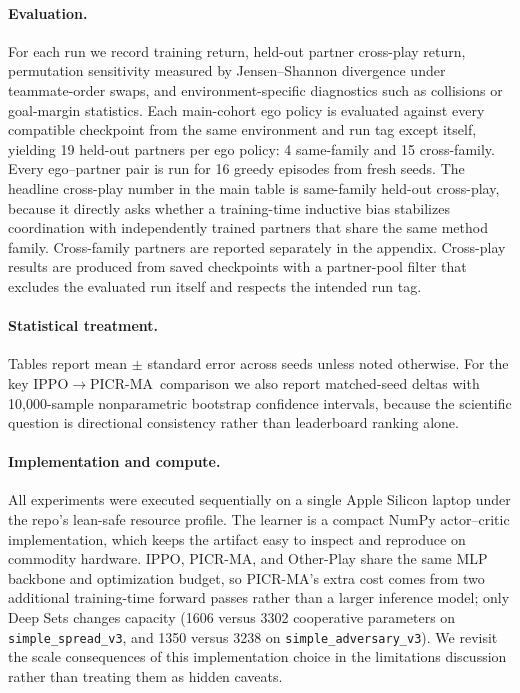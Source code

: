 \documentclass{article}
\newcommand{\method}{PICR-MA}
\begin{document}
\paragraph{Evaluation.}
For each run we record training return, held-out partner cross-play return, permutation sensitivity measured by Jensen--Shannon divergence under teammate-order swaps, and environment-specific diagnostics such as collisions or goal-margin statistics. Each main-cohort ego policy is evaluated against every compatible checkpoint from the same environment and run tag except itself, yielding 19 held-out partners per ego policy: 4 same-family and 15 cross-family. Every ego--partner pair is run for 16 greedy episodes from fresh seeds. The headline cross-play number in the main table is same-family held-out cross-play, because it directly asks whether a training-time inductive bias stabilizes coordination with independently trained partners that share the same method family. Cross-family partners are reported separately in the appendix. Cross-play results are produced from saved checkpoints with a partner-pool filter that excludes the evaluated run itself and respects the intended run tag.

\paragraph{Statistical treatment.}
Tables report mean $\pm$ standard error across seeds unless noted otherwise. For the key IPPO$\rightarrow$\method\ comparison we also report matched-seed deltas with 10{,}000-sample nonparametric bootstrap confidence intervals, because the scientific question is directional consistency rather than leaderboard ranking alone.

\paragraph{Implementation and compute.}
All experiments were executed sequentially on a single Apple Silicon laptop under the repo's lean-safe resource profile. The learner is a compact NumPy actor--critic implementation, which keeps the artifact easy to inspect and reproduce on commodity hardware. IPPO, \method, and Other-Play share the same MLP backbone and optimization budget, so \method's extra cost comes from two additional training-time forward passes rather than a larger inference model; only Deep Sets changes capacity (1606 versus 3302 cooperative parameters on \texttt{simple\_spread\_v3}, and 1350 versus 3238 on \texttt{simple\_adversary\_v3}). We revisit the scale consequences of this implementation choice in the limitations discussion rather than treating them as hidden caveats.
\end{document}
